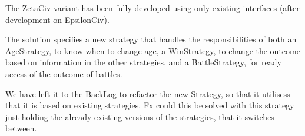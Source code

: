 The ZetaCiv variant has been fully developed using only existing interfaces (after development on EpsilonCiv).

The solution specifies a new strategy that handles the responsibilities of both an AgeStrategy, to know when to change age, a WinStrategy, to change the outcome based on information in the other strategies, and a BattleStrategy, for ready access of the outcome of battles.

We have left it to the BackLog to refactor the new Strategy, so that it utilisess that it is based on existing strategies.
Fx could this be solved with this strategy just holding the already existing versions of the strategies, that it switches between.
